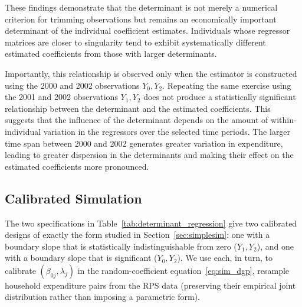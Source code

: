 \documentclass{article}
\begin{document}
These findings demonstrate that the determinant is not merely a numerical criterion for trimming observations but remains an economically important determinant of the individual coefficient estimates. Individuals whose regressor matrices are closer to singularity tend to exhibit systematically different estimated coefficients from those with larger determinants.

Importantly, this relationship is observed only when the estimator is constructed using the 2000 and 2002 observations $Y_0,Y_2$. Repeating the same exercise using the 2001 and 2002 observations $Y_1,Y_2$ does not produce a statistically significant relationship between the determinant and the estimated coefficients. This suggests that the influence of the determinant depends on the amount of within-individual variation in the regressors over the selected time periods. The larger time span between 2000 and 2002 generates greater variation in expenditure, leading to greater dispersion in the determinants and making their effect on the estimated coefficients more pronounced.

\subsection{Calibrated Simulation}
\label{sec:calibrated_sim}

The two specifications in Table~\ref{tab:determinant_regression} give two calibrated designs of exactly the form studied in Section~\ref{sec:simplesim}: one with a boundary slope that is statistically indistinguishable from zero ($Y_1,Y_2$), and one with a boundary slope that is significant ($Y_0,Y_2$). We use each, in turn, to calibrate $(\beta_{0j},\lambda_j)$ in the random-coefficient equation~\eqref{eq:sim_dgp}, resample household expenditure pairs from the RPS data (preserving their empirical joint distribution rather than imposing a parametric form).
\end{document}
